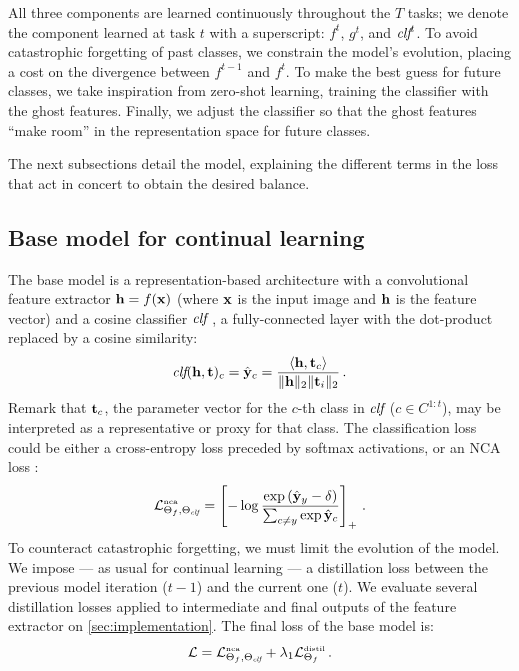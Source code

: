 All three components are learned continuously throughout the $T$ tasks; we denote the component
learned at task $t$ with a superscript: $f^t$, $g^t$, and $\textit{clf}^t$. To avoid catastrophic forgetting
of past classes, we constrain the model's evolution, placing a cost on the divergence between
$f^{t-1}$ and $f^t$. To make the best guess for future classes, we take inspiration from zero-shot
learning, training the classifier with the ghost features. Finally, we adjust the classifier so that
the ghost features “make room” in the representation space for future classes.

The next subsections detail the model, explaining the different terms in the loss that act in
concert to obtain the desired balance.

\subsection{Base model for continual learning}
\label{sec:basemodel}

The base model is a representation-based architecture with a convolutional feature extractor $\mathbf{h} =
    f(\mathbf{x})$ (where $\mathbf{x}$ is the input image and $\mathbf{h}$ is the feature vector) and a cosine classifier
$\textit{clf}$ \cite{luo2018cosine_classifier, hou2019ucir}, a fully-connected layer with the dot-product
replaced by a cosine similarity:
%
\begin{equation}
    \textit{clf}(\mathbf{h}, \mathbf{t})_c = \hat{\mathbf{y}}_c = \frac{\langle \mathbf{h}, \mathbf{t}_c \rangle}{\Vert \mathbf{h} \Vert_2 \Vert \mathbf{t}_i \Vert_2}\,.
    \label{eq:cosine-classifier}
\end{equation}
%
Remark that $\mathbf{t}_c$, the parameter vector for the $c$-th class in $\textit{clf}$ ($c\in C^{1:t}$), may be
interpreted as a representative or proxy for that class. The classification loss could be either a
cross-entropy loss preceded by softmax activations, or an NCA loss \cite{goldberger2005nca_loss,
    attias2017proxynca, douillard2020podnet}:
%
\begin{equation}
    \mathcal{L}^{\text{\tiny{nca}}}_{\Theta_f,\Theta_{\textit{clf}}} = \left[- \log\frac{\exp\left(\hat{\mathbf{y}}_y- \delta\right)}{\sum_{c \neq y} \exp \hat{\mathbf{y}}_c} \right]_+ \,.
    \label{eq:nca}
\end{equation}
%
To counteract catastrophic forgetting, we must limit the evolution of the model. We impose — as
usual for continual learning — a distillation loss between the previous model iteration ($t-1$) and
the current one ($t$). We evaluate several distillation losses applied to intermediate and final
outputs of the feature extractor \cite{douillard2020podnet,hou2019ucir} on
\autoref{sec:implementation}. The final loss of the base model is:
%
\begin{equation}
    \mathcal{L} = \mathcal{L}^{\text{\tiny{nca}}}_{\Theta_f,\Theta_{\textit{clf}}} + \lambda_1 \mathcal{L}^\text{\tiny{distil}}_{\Theta_f}\,.
    \label{eq:basemodel_loss}
\end{equation}

